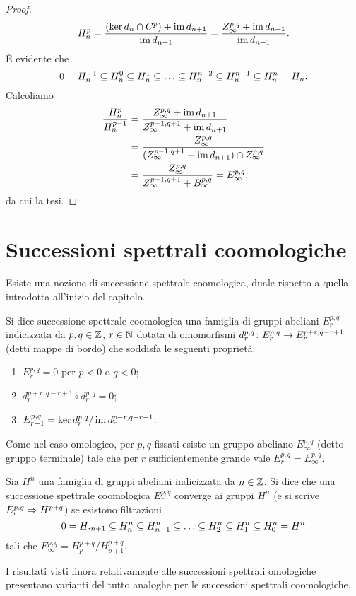 \begin{proof}
$$
H^p_n=\frac{(\ker d_n\cap C^p)+\operatorname{im} d_{n+1}}{\operatorname{im} d_{n+1}}=\frac{Z^{p,q}_\infty+\operatorname{im} d_{n+1}}{\operatorname{im} d_{n+1}}.
$$
È evidente che
$$
0=H^{-1}_n\subseteq H^0_n\subseteq H^1_n\subseteq\ldots\subseteq H^{n-2}_n\subseteq H^{n-1}_n\subseteq H^n_n=H_n.
$$
Calcoliamo
\begin{align*}
\frac{H^p_n}{H^{p-1}_n}&=\frac{Z^{p,q}_\infty+\operatorname{im} d_{n+1}}{Z^{p-1,q+1}_\infty+\operatorname{im} d_{n+1}}\\
&=\frac{Z^{p,q}_\infty}{(Z^{p-1,q+1}_\infty+\operatorname{im} d_{n+1})\cap Z^{p,q}_\infty}\\
&=\frac{Z^{p,q}_\infty}{Z^{p-1,q+1}_\infty+B^{p,q}_\infty}=E^{p,q}_\infty,
\end{align*}
da cui la tesi.
\end{proof}

\section{Successioni spettrali coomologiche}

Esiste una nozione di successione spettrale coomologica, duale rispetto a quella introdotta all'inizio del capitolo.

\begin{definition}
Si dice successione spettrale coomologica una famiglia di gruppi abeliani $E^{p,q}_r$ indicizzata da $p,q\in\mathbb{Z}$, $r\in\mathbb{N}$ dotata di omomorfismi $d^{p,q}_r\colon E^{p,q}_r\to E^{p+r,q-r+1}_r$ (detti mappe di bordo) che soddisfa le seguenti proprietà:
\begin{enumerate}
\item $E^{p,q}_r=0$ per $p<0$ o $q<0$;
\item $d^{p+r,q-r+1}_r\circ d^{p,q}_r=0$;
\item $E^{p,q}_{r+1}=\ker d^{p,q}_r/\operatorname{im} d^{p-r,q+r-1}_r$.
\end{enumerate}
\end{definition}
Come nel caso omologico, per $p,q$ fissati esiste un gruppo abeliano $E^{p,q}_\infty$ (detto gruppo terminale) tale che per $r$ sufficientemente grande vale $E^{p,q}_r=E^{p,q}_\infty$.
\begin{definition}
Sia $H^n$ una famiglia di gruppi abeliani indicizzata da $n\in\mathbb{Z}$.
Si dice che una successione spettrale coomologica $E^{p,q}_r$ converge ai gruppi $H^n$ (e si scrive $E^{p,q}_r\Rightarrow H^{p+q}$) se esistono filtrazioni
$$
0=H^^n_{n+1}\subs H^n_n\subs H^n_{n-1}\subs\ldots\subs H^n_2\subs H^n_1\subs H^n_0=H^n
$$
tali che $E^{p,q}_\infty=H^{p+q}_p/H^{p+q}_{p+1}$.
\end{definition}
I risultati visti finora relativamente alle successioni spettrali omologiche presentano varianti del tutto analoghe per le successioni spettrali coomologiche.
